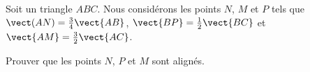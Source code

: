 
\begin{exercice}\label{exosmath-0054}

    Soit un triangle \( ABC\). Nous considérons les points \( N\), \( M\) et \( P\) tels que \( \vect(AN)=\frac{ 3 }{ 4 }\vect{AB}\), \( \vect{BP}=\frac{ 1 }{2}\vect{BC}\) et \( \vect{AM}=\frac{ 3 }{2}\vect{AC}\).

    Prouver que les points \( N\), \( P\) et \( M\) sont alignés.

\end{exercice}
